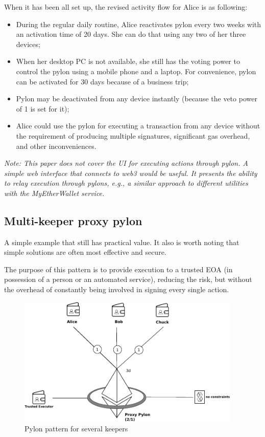 \documentclass[12pt]{article}
\begin{document}
When it has been all set up, the revised activity flow for Alice is as following:
\begin{itemize}
\item{During the regular daily routine, Alice reactivates pylon every two weeks with an activation time of 20 days. She can do that using any two of her three devices;}
\item{When her desktop PC is not available, she still has the voting power to control the pylon using a mobile phone and a laptop. For convenience, pylon can be activated for 30 days because of a business trip;}
\item{Pylon may be deactivated from any device instantly (because the veto power of 1 is set for it);}
\item{Alice could use the pylon for executing a transaction from any device without the requirement of producing multiple signatures, significant gas overhead, and other inconveniences.}
\end{itemize}


\emph{Note: This paper does not cover the UI for executing actions through pylon. A simple web interface that connects to web3 would be useful. It presents the ability to relay execution through pylons, e.g., a similar approach to different utilities with the MyEtherWallet service.}

\pagebreak
\subsection{Multi-keeper proxy pylon}

A simple example that still has practical value. It also is worth noting that simple solutions are often most effective and secure.

The purpose of this pattern is to provide execution to a trusted EOA (in possession of a person or an automated service), reducing the risk, but without the overhead of constantly being involved in signing every single action.

\begin{figure}[h!]
  \begin{center}
    \includegraphics[width=0.95\textwidth]{pylon_example_proxy_pylon.pdf}
    \caption[Figure 1]{Pylon pattern for several keepers
    \label{fig:pylon_example_proxy_pylon}}
  \end{center}
\end{figure}
\end{document}
